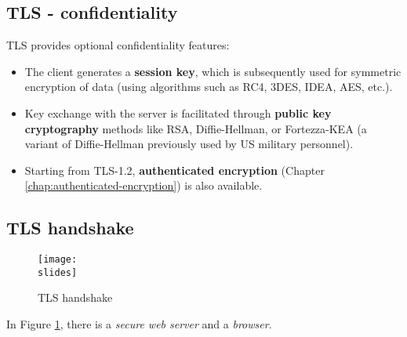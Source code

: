 \subsection{TLS - confidentiality}
TLS provides optional confidentiality features:

\begin{itemize}
    \item The client generates a \textbf{session key}, which is subsequently used for symmetric encryption of data (using algorithms such as RC4, 3DES, IDEA, AES, etc.).
    \item Key exchange with the server is facilitated through \textbf{public key cryptography} methods like RSA, Diffie-Hellman, or Fortezza-KEA (a variant of Diffie-Hellman previously used by US military personnel).
    \item Starting from TLS-1.2, \textbf{authenticated encryption} (Chapter \ref{chap:authenticated-encryption}) is also available.
\end{itemize}


\subsection{TLS handshake}
\begin{figure}[h]
    \centering
    \texttt{[image: \\slides]}
    \caption{TLS handshake}
    \label{fig:tls-handshake}
\end{figure}

In Figure \ref{fig:tls-handshake}, there is a \textit{secure web server} and a \textit{browser}.

